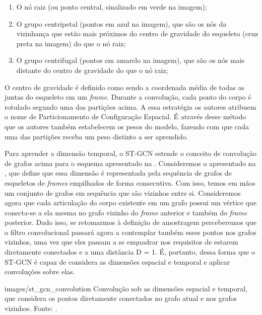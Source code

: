 \begin{enumerate}
    \item O nó raiz (ou ponto central, sinalizado em verde na imagem);
    \item O grupo centripetal (pontos em azul na imagem), que são os nós da vizinhança que estão mais próximos do centro de gravidade do esqueleto (cruz preta na imagem) do que o nó raiz;
    \item O grupo centrifugal (pontos em amarelo na imagem), que são os nós mais distante do centro de gravidade do que o nó raiz;
\end{enumerate}

O centro de gravidade é definido como sendo a coordenada média de todas as juntas do esqueleto em um \textit{frame}. Durante a convolução, cada ponto do corpo é rotulado segundo uma das partições acima. A essa estratégia os autores atribuem o nome de Particionamento de Configuração Espacial. É através desse método que os autores também estabelecem os pesos do modelo, fazendo com que cada uma das partições receba um peso distinto a ser aprendido.


Para aprender a dimensão temporal, o ST-GCN estende o conceito de convolução de grafos acima para o esquema apresentado na . Consideremos o apresentado na , que define que essa dimensão é representada pela sequência de grafos de esqueletos de \textit{frames} empilhados de forma consecutiva. Com isso, temos em mãos um conjunto de grafos em sequência que são vizinhos entre si. Consideremos agora que cada articulação do corpo existente em um grafo possui um vértice que conecta-se a ela mesma no grafo vizinho do \textit{frame} anterior e também do \textit{frame} posterior. Dado isso, se retomarmos à definição de amostragem perceberemos que o filtro convolucional passará agora a contemplar também esses pontos nos grafos vizinhos, uma vez que eles passam a se enquadrar nos requisitos de estarem diretamente conectados e a uma distância D = 1. É, portanto, dessa forma que o ST-GCN é capaz de considera as dimensões espacial e temporal e aplicar convoluções sobre elas.

    {images/st_gcn_convolution}
    {Convolução sob as dimensões espacial e temporal, que considera os pontos diretamente conectados no grafo atual e nos grafos vizinhos. Fonte: \cite[p. 3]{st-gcn-2018}.}


